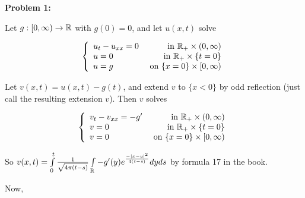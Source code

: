 \documentclass[a4paper,12pt]{article}
\begin{document}
{\bf Problem 1:}

Let $g: [0,\infty) \to \mathbb{R}$ with $g(0) = 0$, and let $u(x,t)$ solve

\begin{displaymath}
   \left\{
     \begin{array}{lr}
       u_t - u_{xx} = 0 & \text{ in } \mathbb{R}_+ \times (0,\infty) \\
       u=0 & \text{ in } \mathbb{R}_+ \times \{t=0\}\\
       u=g & \text{ on } \{x=0\} \times [0,\infty)
     \end{array}
   \right.
\end{displaymath}

Let $v(x,t) = u(x,t) - g(t)$, and extend $v$ to $\{x<0\}$ by odd reflection (just call the resulting extension $v$). Then $v$ solves

\begin{displaymath}
   \left\{
     \begin{array}{lr}
       v_t - v_{xx} = -g' & \text{ in } \mathbb{R}_+ \times (0,\infty) \\
       v=0 & \text{ in } \mathbb{R}_+ \times \{t=0\}\\
       v=0 & \text{ on } \{x=0\} \times [0,\infty)
     \end{array}
   \right.
\end{displaymath}

So $v(x,t) = \int\limits_0^t \frac{1}{\sqrt{4 \pi (t-s)}} \int\limits_{\mathbb{R}} -g'(y) e^{\frac{-\left\lvert x-y \right\rvert^2}{4(t-s)}} dy ds$ by formula 17 in the book.

Now,
\end{document}
